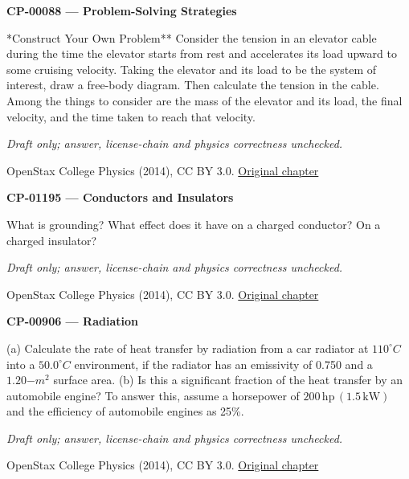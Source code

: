 \par\medskip
\noindent\textbf{CP-00088 — Problem-Solving Strategies}
\par **Construct Your Own Problem** Consider the tension in an elevator cable during the time the elevator starts from rest and accelerates its load upward to some cruising velocity. Taking the elevator and its load to be the system of interest, draw a free-body diagram. Then calculate the tension in the cable. Among the things to consider are the mass of the elevator and its load, the final velocity, and the time taken to reach that velocity.
\par\smallskip
\textit{Draft only; answer, license-chain and physics correctness unchecked.}
\par{\footnotesize OpenStax College Physics (2014), CC BY 3.0. \href{https://github.com/philschatz/physics-book/blob/a7efaa7e221fab1694022d8bb98b83a73ee31d3d/contents/m42076.md}{Original chapter}}\par\normalsize

\par\medskip
\noindent\textbf{CP-01195 — Conductors and Insulators}
\par What is grounding? What effect does it have on a charged conductor? On a charged insulator?
\par\smallskip
\textit{Draft only; answer, license-chain and physics correctness unchecked.}
\par{\footnotesize OpenStax College Physics (2014), CC BY 3.0. \href{https://github.com/philschatz/physics-book/blob/a7efaa7e221fab1694022d8bb98b83a73ee31d3d/contents/m42306.md}{Original chapter}}\par\normalsize

\par\medskip
\noindent\textbf{CP-00906 — Radiation}
\par (a) Calculate the rate of heat transfer by radiation from a car radiator at $110^{\circ}C$ into a $50.0^{\circ}C$ environment, if the radiator has an emissivity of 0.750 and a $1.20{-m}^{2}$ surface area. (b) Is this a significant fraction of the heat transfer by an automobile engine? To answer this, assume a horsepower of $200\,\mathrm{hp}\,(1.5\,\mathrm{kW})$ and the efficiency of automobile engines as 25\%.
\par\smallskip
\textit{Draft only; answer, license-chain and physics correctness unchecked.}
\par{\footnotesize OpenStax College Physics (2014), CC BY 3.0. \href{https://github.com/philschatz/physics-book/blob/a7efaa7e221fab1694022d8bb98b83a73ee31d3d/contents/m42230.md}{Original chapter}}\par\normalsize

